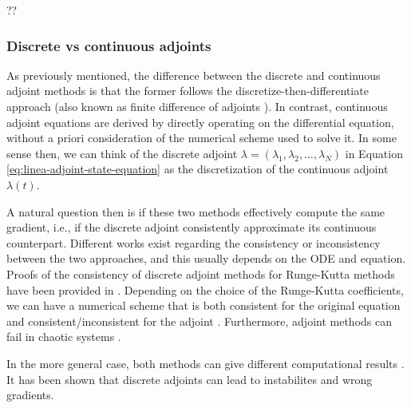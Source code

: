 ??

\subsubsection{Discrete vs continuous adjoints}

As previously mentioned, the difference between the discrete and continuous adjoint methods is that the former follows the discretize-then-differentiate approach (also known as finite difference of adjoints \cite{Sirkes_Tziperman_1997}).
In contrast, continuous adjoint equations are derived by directly operating on the differential equation, without a priori consideration of the numerical scheme used to solve it. 
In some sense then, we can think of the discrete adjoint $\lambda = (\lambda_1, \lambda_2, \ldots, \lambda_N)$ in Equation \eqref{eq:linea-adjoint-state-equation} as the discretization of the continuous adjoint $\lambda(t)$. 

A natural question then is if these two methods effectively compute the same gradient, i.e., if the discrete adjoint consistently approximate its continuous counterpart. 
Different works exist regarding the consistency or inconsistency between the two approaches, and this usually depends on the ODE and equation.  
Proofs of the consistency of discrete adjoint methods for Runge-Kutta methods have been provided in \cite{sandu2006properties, sandu2011solution}.
Depending on the choice of the Runge-Kutta coefficients, we can have a numerical scheme that is both consistent for the original equation and consistent/inconsistent for the adjoint \cite{Hager_2000}.
Furthermore, adjoint methods can fail in chaotic systems \cite{Wang2012-chaos-adjoint}.

In the more general case, both methods can give different computational results \cite{Sirkes_Tziperman_1997}.
It has been shown \cite{Sirkes_Tziperman_1997} that discrete adjoints can lead to instabilites and wrong gradients.